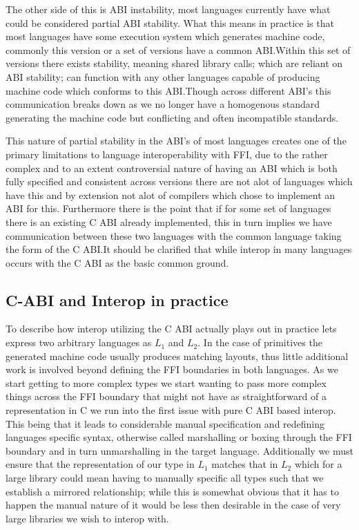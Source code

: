 The other side of this is ABI instability, most languages currently have what could be considered partial ABI stability. What this means in practice is that most languages have some execution system which generates machine code, commonly this version or a set of versions have a common ABI.\@ Within this set of versions there exists stability, meaning shared library calls; which are reliant on ABI stability; can function with any other languages capable of producing machine code which conforms to this ABI.\@ Though across different ABI's this communication breaks down as we no longer have a homogenous standard generating the machine code but conflicting and often incompatible standards. 

This nature of partial stability in the ABI's of most languages creates one of the primary limitations to language interoperability with FFI, due to the rather complex and to an extent controversial nature of having an ABI which is both fully specified and consistent across versions there are not alot of languages which have this and by extension not alot of compilers which chose to implement an ABI for this. Furthermore there is the point that if for some set of languages there is an existing C ABI already implemented, this in turn implies we have communication between these two languages with the common language taking the form of the C ABI.\@ It should be clarified that while interop in many languages occurs with the C ABI as the basic common ground. 

\subsection{C-ABI and Interop in practice}

To describe how interop utilizing the C ABI actually plays out in practice lets express two arbitrary languages as $L_1$ and $L_2$. In the case of primitives the generated machine code usually produces matching layouts, thus little additional work is involved beyond defining the FFI boundaries in both languages. As we start getting to more complex types we start wanting to pass more complex things across the FFI boundary that might not have as straightforward of a representation in C we run into the first issue with pure C ABI based interop. This being that it leads to considerable manual specification and redefining languages specific syntax, otherwise called marshalling or boxing through the FFI boundary and in turn unmarshalling in the target language. Additionally we must ensure that the representation of our type in $L_1$ matches that in $L_2$ which for a large library could mean having to manually specific all types such that we establish a mirrored relationship; while this is somewhat obvious that it has to happen the manual nature of it would be less then desirable in the case of very large libraries we wish to interop with.

